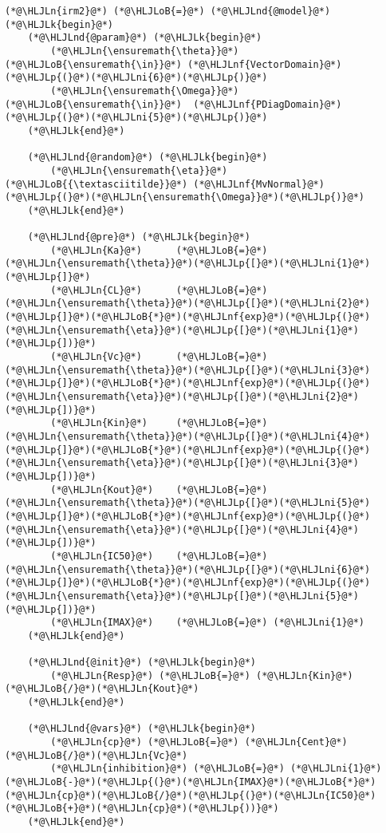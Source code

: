 \documentclass[12pt,a4paper]{article}
\newcommand{\HLJLk}[1]{\textcolor[RGB]{148,91,176}{\textbf{#1}}}
\newcommand{\HLJLn}[1]{#1}
\newcommand{\HLJLnd}[1]{\textcolor[RGB]{214,102,97}{#1}}
\newcommand{\HLJLnf}[1]{\textcolor[RGB]{66,102,213}{#1}}
\newcommand{\HLJLni}[1]{\textcolor[RGB]{59,151,46}{#1}}
\newcommand{\HLJLoB}[1]{\textcolor[RGB]{102,102,102}{\textbf{#1}}}
\newcommand{\HLJLp}[1]{#1}
\begin{document}
\begin{lstlisting}
(*@\HLJLn{irm2}@*) (*@\HLJLoB{=}@*) (*@\HLJLnd{@model}@*) (*@\HLJLk{begin}@*)
    (*@\HLJLnd{@param}@*) (*@\HLJLk{begin}@*)
        (*@\HLJLn{\ensuremath{\theta}}@*) (*@\HLJLoB{\ensuremath{\in}}@*) (*@\HLJLnf{VectorDomain}@*)(*@\HLJLp{(}@*)(*@\HLJLni{6}@*)(*@\HLJLp{)}@*)
        (*@\HLJLn{\ensuremath{\Omega}}@*) (*@\HLJLoB{\ensuremath{\in}}@*)  (*@\HLJLnf{PDiagDomain}@*)(*@\HLJLp{(}@*)(*@\HLJLni{5}@*)(*@\HLJLp{)}@*)
    (*@\HLJLk{end}@*)

    (*@\HLJLnd{@random}@*) (*@\HLJLk{begin}@*)
        (*@\HLJLn{\ensuremath{\eta}}@*) (*@\HLJLoB{{\textasciitilde}}@*) (*@\HLJLnf{MvNormal}@*)(*@\HLJLp{(}@*)(*@\HLJLn{\ensuremath{\Omega}}@*)(*@\HLJLp{)}@*)
    (*@\HLJLk{end}@*)

    (*@\HLJLnd{@pre}@*) (*@\HLJLk{begin}@*)
        (*@\HLJLn{Ka}@*)      (*@\HLJLoB{=}@*) (*@\HLJLn{\ensuremath{\theta}}@*)(*@\HLJLp{[}@*)(*@\HLJLni{1}@*)(*@\HLJLp{]}@*)
        (*@\HLJLn{CL}@*)      (*@\HLJLoB{=}@*) (*@\HLJLn{\ensuremath{\theta}}@*)(*@\HLJLp{[}@*)(*@\HLJLni{2}@*)(*@\HLJLp{]}@*)(*@\HLJLoB{*}@*)(*@\HLJLnf{exp}@*)(*@\HLJLp{(}@*)(*@\HLJLn{\ensuremath{\eta}}@*)(*@\HLJLp{[}@*)(*@\HLJLni{1}@*)(*@\HLJLp{])}@*)
        (*@\HLJLn{Vc}@*)      (*@\HLJLoB{=}@*) (*@\HLJLn{\ensuremath{\theta}}@*)(*@\HLJLp{[}@*)(*@\HLJLni{3}@*)(*@\HLJLp{]}@*)(*@\HLJLoB{*}@*)(*@\HLJLnf{exp}@*)(*@\HLJLp{(}@*)(*@\HLJLn{\ensuremath{\eta}}@*)(*@\HLJLp{[}@*)(*@\HLJLni{2}@*)(*@\HLJLp{])}@*)
        (*@\HLJLn{Kin}@*)     (*@\HLJLoB{=}@*) (*@\HLJLn{\ensuremath{\theta}}@*)(*@\HLJLp{[}@*)(*@\HLJLni{4}@*)(*@\HLJLp{]}@*)(*@\HLJLoB{*}@*)(*@\HLJLnf{exp}@*)(*@\HLJLp{(}@*)(*@\HLJLn{\ensuremath{\eta}}@*)(*@\HLJLp{[}@*)(*@\HLJLni{3}@*)(*@\HLJLp{])}@*)
        (*@\HLJLn{Kout}@*)    (*@\HLJLoB{=}@*) (*@\HLJLn{\ensuremath{\theta}}@*)(*@\HLJLp{[}@*)(*@\HLJLni{5}@*)(*@\HLJLp{]}@*)(*@\HLJLoB{*}@*)(*@\HLJLnf{exp}@*)(*@\HLJLp{(}@*)(*@\HLJLn{\ensuremath{\eta}}@*)(*@\HLJLp{[}@*)(*@\HLJLni{4}@*)(*@\HLJLp{])}@*)
        (*@\HLJLn{IC50}@*)    (*@\HLJLoB{=}@*) (*@\HLJLn{\ensuremath{\theta}}@*)(*@\HLJLp{[}@*)(*@\HLJLni{6}@*)(*@\HLJLp{]}@*)(*@\HLJLoB{*}@*)(*@\HLJLnf{exp}@*)(*@\HLJLp{(}@*)(*@\HLJLn{\ensuremath{\eta}}@*)(*@\HLJLp{[}@*)(*@\HLJLni{5}@*)(*@\HLJLp{])}@*)
        (*@\HLJLn{IMAX}@*)    (*@\HLJLoB{=}@*) (*@\HLJLni{1}@*)
    (*@\HLJLk{end}@*)

    (*@\HLJLnd{@init}@*) (*@\HLJLk{begin}@*)
        (*@\HLJLn{Resp}@*) (*@\HLJLoB{=}@*) (*@\HLJLn{Kin}@*)(*@\HLJLoB{/}@*)(*@\HLJLn{Kout}@*)
    (*@\HLJLk{end}@*)

    (*@\HLJLnd{@vars}@*) (*@\HLJLk{begin}@*)
        (*@\HLJLn{cp}@*) (*@\HLJLoB{=}@*) (*@\HLJLn{Cent}@*)(*@\HLJLoB{/}@*)(*@\HLJLn{Vc}@*)
        (*@\HLJLn{inhibition}@*) (*@\HLJLoB{=}@*) (*@\HLJLni{1}@*)(*@\HLJLoB{-}@*)(*@\HLJLp{(}@*)(*@\HLJLn{IMAX}@*)(*@\HLJLoB{*}@*)(*@\HLJLn{cp}@*)(*@\HLJLoB{/}@*)(*@\HLJLp{(}@*)(*@\HLJLn{IC50}@*)(*@\HLJLoB{+}@*)(*@\HLJLn{cp}@*)(*@\HLJLp{))}@*)
    (*@\HLJLk{end}@*)


\end{lstlisting}
\end{document}
